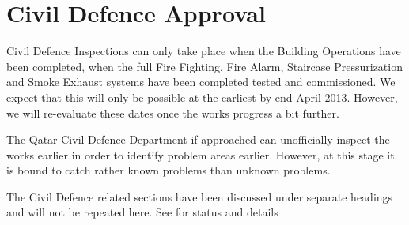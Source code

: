 \chapter{Civil Defence Approval}
\label{civildefence}
Civil Defence Inspections can only take place when the Building Operations have been completed, when the full Fire Fighting,  Fire Alarm, Staircase Pressurization and Smoke Exhaust systems have been completed tested and commissioned. We expect that this will only be possible at the earliest by end April  2013. However, we will re-evaluate these dates once the works progress a bit further. 


The Qatar Civil Defence Department if approached can unofficially inspect the works earlier in order to identify problem areas earlier. However, at this stage it is bound to catch rather known problems than unknown problems.

The Civil Defence related sections have been discussed under separate headings and will not be repeated here. See  for status and details
\medskip

